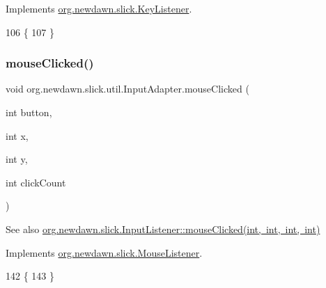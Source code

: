 Implements \mbox{\hyperlink{interfaceorg_1_1newdawn_1_1slick_1_1_key_listener_a474673b59bc77266bcef3c261c26ee2b}{org.\+newdawn.\+slick.\+Key\+Listener}}.


\begin{DoxyCode}
106                                              \{
107     \}
\end{DoxyCode}
\mbox{\label{classorg_1_1newdawn_1_1slick_1_1util_1_1_input_adapter_acc4caea33acf2a96521865286d414651}} 
\subsubsection{\texorpdfstring{mouse\+Clicked()}{mouseClicked()}}
{\footnotesize\ttfamily void org.\+newdawn.\+slick.\+util.\+Input\+Adapter.\+mouse\+Clicked (\begin{DoxyParamCaption}\item[{int}]{button,  }\item[{int}]{x,  }\item[{int}]{y,  }\item[{int}]{click\+Count }\end{DoxyParamCaption})\hspace{0.3cm}{\ttfamily [inline]}}

\begin{DoxySeeAlso}{See also}
\mbox{\hyperlink{interfaceorg_1_1newdawn_1_1slick_1_1_mouse_listener_a3e42b74c252ecdc7418b0ee8bcae5510}{org.\+newdawn.\+slick.\+Input\+Listener\+::mouse\+Clicked(int, int, int, int)}} 
\end{DoxySeeAlso}


Implements \mbox{\hyperlink{interfaceorg_1_1newdawn_1_1slick_1_1_mouse_listener_a3e42b74c252ecdc7418b0ee8bcae5510}{org.\+newdawn.\+slick.\+Mouse\+Listener}}.


\begin{DoxyCode}
142                                                                        \{
143     \}
\end{DoxyCode}
\mbox{\label{classorg_1_1newdawn_1_1slick_1_1util_1_1_input_adapter_a185b6e79c736d75fb3dd7319ff1d147a}} 
